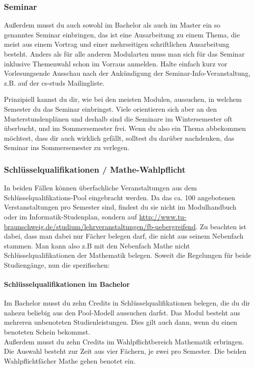 \begin{multicols}{2}
	\subsubsection{Seminar}
	Außerdem musst du auch sowohl im Bachelor als auch im Master ein so genanntes Seminar einbringen, das ist eine Ausarbeitung zu einem Thema, die meist aus einem Vortrag und einer mehrseitigen schriftlichen Ausarbeitung besteht. Anders als für alle anderen Modularten muss man sich für das Seminar inklusive Themenwahl schon im Vorraus anmelden. Halte einfach kurz vor Vorlesungsende Ausschau nach der Ankündigung der Seminar-Info-Veranstaltung, z.B. auf der cs-studs Mailingliste.

	Prinzipiell kannst du dir, wie bei den meisten Modulen, aussuchen, in welchem Semester du das Seminar einbringst. Viele orientieren sich aber an den Musterstundenplänen und deshalb sind die Seminare im Wintersemester oft überbucht, und im Sommersemester frei. Wenn du also ein Thema abbekommen möchtest, dass dir auch wirklich gefällt, solltest du darüber nachdenken, das Seminar ins Sommersemester zu verlegen.

	\subsubsection{Schlüsselqualifikationen / Mathe-Wahl\-pflicht}
	In beiden Fällen können überfachliche Veranstaltungen aus dem Schlüsselqualifikations-Pool eingebracht werden. Da das ca. 100 angebotenen Verstanstaltungen pro Semester sind, findest du sie nicht im Modulhandbuch oder im Informatik-Studenplan, sondern auf \url{http://www.tu-braunschweig.de/studium/lehrveranstaltungen/fb-uebergreifend}. Zu beachten ist dabei, dass man dabei nur Fächer belegen darf, die nicht aus seinem Nebenfach stammen. Man kann also z.B mit den Nebenfach Mathe nicht Schlüsselqualifikationen der Mathematik belegen. Soweit die Regelungen für beide Studiengänge, nun die spezifischen:

	\paragraph*{Schlüsselqualifikationen im Bachelor}
	Im Bachelor musst du zehn Credits in Schlüsselqualifikationen belegen, die du dir nahezu beliebig aus den Pool-Modell aussuchen darfst. Das Modul besteht aus mehreren unbenoteten Studienleistungen. Dies gilt auch dann, wenn du einen benoteten Schein bekommst.\\
	Außerdem musst du zehn Credits im Wahlpflichtbereich Mathematik erbringen. Die Auswahl besteht zur Zeit aus vier Fächern, je zwei pro Semester. Die beiden Wahlpflichtfächer Mathe gehen benotet ein.


\end{multicols}
